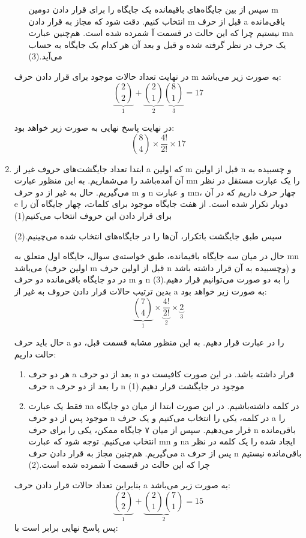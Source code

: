 \begin{enumerate}
\begin{enumerate}
      سپس از بین جایگاه‌های باقیمانده یک جایگاه را برای قرار دادن دومین m انتخاب کنیم. دقت شود که مجاز به قرار دادن m قبل از حرف a باقی‌مانده نیستیم چرا که این حالت در قسمت آ شمرده شده است. هم‌چنین عبارت ma یک حرف در نظر گرفته شده و قبل و بعد آن هر کدام یک جایگاه به حساب می‌آید.(3)
    \end{enumerate}
    در نهایت تعداد حالات موجود برای قرار دادن حرف m به صورت زیر می‌باشد:
    $$\underbrace{2\choose 2}_{1} + \underbrace{2\choose 1}_{2}\underbrace{8\choose 1}_{3} = 17$$
    
    در نهایت پاسخ نهایی به صورت زیر خواهد بود:
    $${8\choose 4} \times \frac{4!}{2!} \times 17$$
    \item
    ابتدا تعداد جایگشت‌های  حروف غیر از a که اولین m قبل از اولین n و چسبیده به آن آمده‌باشد را می‌شماریم.
    به این منظور عبارت mn را یک عبارت مستقل در نظر می‌گیریم.
    حال به غیر از دو حرف m و n و عبارت mn، 
    چهار حرف داریم که در آن e دوبار تکرار شده است.
    از هفت جایگاه موجود برای کلمات، چهار جایگاه آن را برای قرار دادن این حروف انتخاب می‌کنیم(1)
    
    سپس طبق جایگشت باتکرار، آن‌ها را در جایگاه‌های انتخاب شده می‌چینیم.(2)
    
    حال در میان سه جایگاه باقیمانده، طبق خواسته‌ی سوال، جایگاه اول متعلق به mn می‌باشد
    (اولین حرف m قبل از اولین حرف n وچسبیده به آن قرار داشته باشد)
    و در دو جایگاه باقی‌مانده دو حرف m و n را به دو صورت می‌توانیم قرار دهیم.(3)\\
    بدین ترتیب حالات قرار دادن حروف به غیر از a به صورت زیر خواهد بود:
    $$\underbrace{{7\choose 4}}_{1} \times \underbrace{\frac{4!}{2!}}_{2} \times \underbrace{2}_{3}$$
    
    حال باید حرف a را در عبارت قرار دهیم.
    به این منظور مشابه قسمت قبل، دو حالت داریم:
    \begin{enumerate}
      \item 
      هر دو حرف a بعد از دو حرف n قرار داشته باشد. در این صورت کافیست دو حرف a را بعد از دو حرف n موجود در جایگشت قرار دهیم.(1)
      \item
      فقط یک عبارت na در کلمه داشته‌باشیم. در این صورت ابتدا از میان دو جایگاه موجود پس از دو حرف n در کلمه، یکی را انتخاب می‌کنیم و یک حرف a را قرار می‌دهیم. سپس از میان ۷ جایگاه ممکن، یکی را برای حرف n باقی‌مانده انتخاب می‌کنیم.
      توجه شود که عبارت mn و na ایجاد شده را یک کلمه‌ در نظر می‌گیریم. هم‌چنین مجاز به قرار دادن حرف a پس از حرف n باقی‌مانده نیستیم چرا که این حالت در قسمت آ شمرده شده است.(2)
    \end{enumerate}
    بنابراین تعداد حالات قرار دادن حرف a به صورت زیر می‌باشد:
    $$\underbrace{2\choose 2}_{1} + \underbrace{{2\choose 1}{7\choose 1}}_{2} = 15$$ 
    پس پاسخ نهایی برابر است با:
    

\end{enumerate}
